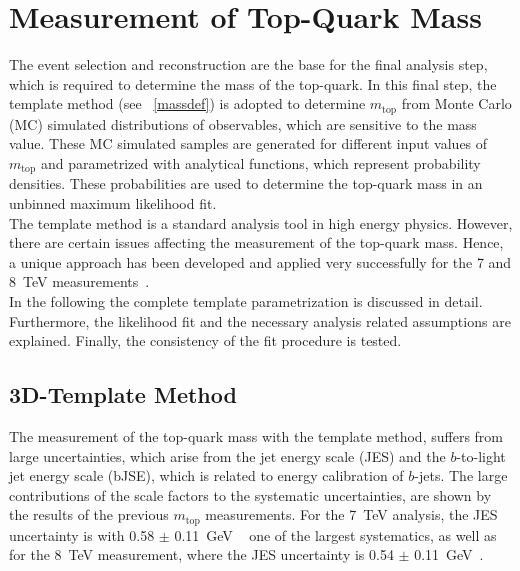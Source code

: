 \chapter{Measurement of Top-Quark Mass}
\label{sec:Temp1}

The event selection and reconstruction are the base for the final analysis step, which is required to determine the mass of the top-quark. In this final step, the template method (see ~\cref{massdef}) is adopted to determine $m_{\text{top}}$  from Monte Carlo (MC) simulated distributions of observables, which are sensitive to the mass value. These MC simulated samples are generated for different input values of $m_{\text{top}}$ and parametrized with analytical functions, which represent probability densities. These probabilities are used to determine the top-quark mass in an unbinned maximum likelihood fit.\\

\noindent The template method is a standard analysis tool in high energy physics. However, there are certain issues affecting the measurement of the top-quark mass.  Hence, a unique approach has been developed and applied very successfully for the 7 and 8~TeV measurements~\cite{Aad:2015nba,ATLAS-CONF-2017-071}.\\

\noindent In the following the complete template parametrization is discussed in detail. Furthermore, the likelihood fit and the necessary analysis related assumptions are explained. Finally, the consistency of the fit procedure is tested. 


\section{3D-Template Method}
The measurement of the top-quark mass with the template method, suffers from large uncertainties, which arise from the jet energy scale (JES) and the $b$-to-light jet energy scale (bJSE), which is related to energy calibration of $b$-jets. The large contributions of the scale factors to the systematic uncertainties,  are shown by the results of the previous $m_{\text{top}}$ measurements. For  the 7~TeV analysis, the JES uncertainty is with 0.58 $ \pm $ 0.11~GeV ~\cite{Aad:2015nba} one of the largest systematics, as well as for  the 8~TeV measurement, where the JES uncertainty is 0.54 $\pm$ 0.11~GeV~\cite{ATLAS-CONF-2017-071}.\\


